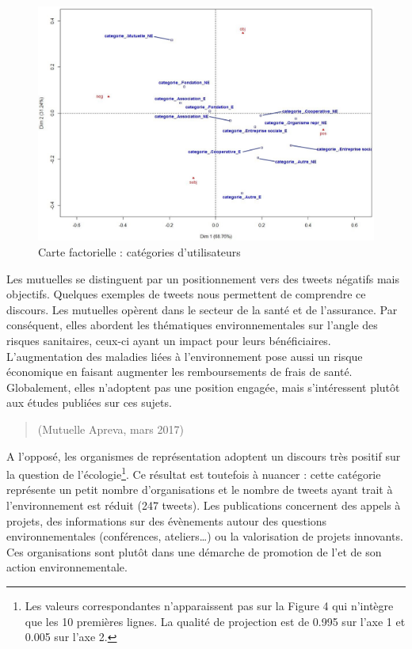             \begin{figure}
                \caption{Carte factorielle : catégories d'utilisateurs}
                \label{fig:AFCcategories}
                \includegraphics[width=\linewidth]{fig/AFC_categories.JPG}
            \end{figure}

            Les mutuelles se distinguent par un positionnement vers des tweets négatifs mais objectifs. Quelques exemples de tweets nous permettent de comprendre ce discours. Les mutuelles opèrent dans le secteur de la santé et de l’assurance. Par conséquent, elles abordent les thématiques environnementales sur l’angle des risques sanitaires, ceux-ci ayant un impact pour leurs bénéficiaires. L’augmentation des maladies liées à l’environnement pose aussi un risque économique en faisant augmenter les remboursements de frais de santé. Globalement, elles n’adoptent pas une position engagée, mais s’intéressent plutôt aux études publiées sur ces sujets.

            \begin{quotation}
              (Mutuelle Apreva, mars 2017)
            \end{quotation}

            A l’opposé, les organismes de représentation adoptent un discours très positif sur la question de l’écologie\footnote{Les valeurs correspondantes n’apparaissent pas sur la Figure 4 qui n’intègre que les 10 premières lignes. La qualité de projection est de 0.995 sur l’axe 1 et 0.005 sur l’axe 2.}. Ce résultat est toutefois à nuancer : cette catégorie représente un petit nombre d’organisations et le nombre de tweets ayant trait à l’environnement est réduit (247 tweets). Les publications concernent des appels à projets, des informations sur des évènements autour des questions environnementales (conférences, ateliers…) ou la valorisation de projets innovants. Ces organisations sont plutôt dans une démarche de promotion de l'\ess et de son action environnementale.


